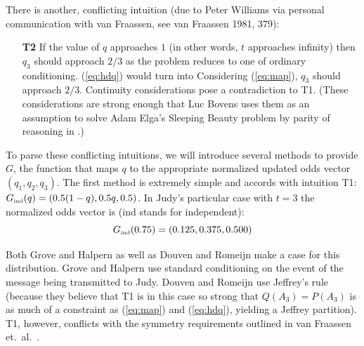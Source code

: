 \documentclass[12pt]{article}
\begin{document}
\nial There is another, conflicting intuition (due to Peter Williams
via personal communication with van Fraassen, see van Fraassen 1981,
379)\nonsc{}:

\begin{enumerate}
\item[\textbf{T2}] If the value of $q$ approaches $1$ (in other words,
  $t$ approaches infinity) then $q_{3}$ should approach $2/3$ as the
  problem reduces to one of ordinary conditioning. ({\ref{eq:hdq}})
  would turn into  Considering
  ({\ref{eq:map}}), $q_{3}$ should approach $2/3$. Continuity
  considerations pose a contradiction to T1. (These considerations are
  strong enough that Luc Bovens uses them as an assumption to solve
  Adam Elga's Sleeping Beauty problem by parity of reasoning in
  .)
\end{enumerate}

\nial To parse these conflicting intuitions, we will introduce several
methods to provide $G$, the function that maps $q$ to the appropriate
normalized updated odds vector $(q_{1},q_{2},q_{3})$. The first
method is extremely simple and accords with intuition T1:
$G_{\mbox{{\tiny ind}}}(q)=(0.5(1-q),0.5q,0.5)$. In Judy's particular
case with $t=3$ the normalized odds vector is (ind stands for
independent):
\begin{displaymath}
  G_{\mbox{{\tiny ind}}}(0.75)=(0.125,0.375,0.500)
\end{displaymath}

\nial Both Grove and Halpern  as well as
Douven and Romeijn  make a case for this
distribution. Grove and Halpern use standard conditioning on the event
of the message being transmitted to Judy. Douven and Romeijn use
Jeffrey's rule (because they believe that T1 is in this case so strong
that $Q(A_{3})=P(A_{3})$ is as much of a constraint as (\ref{eq:map})
and (\ref{eq:hdq}), yielding a Jeffrey partition). T1, however,
conflicts with the symmetry requirements outlined in van Fraassen et.\
al.\ .
\end{document}
